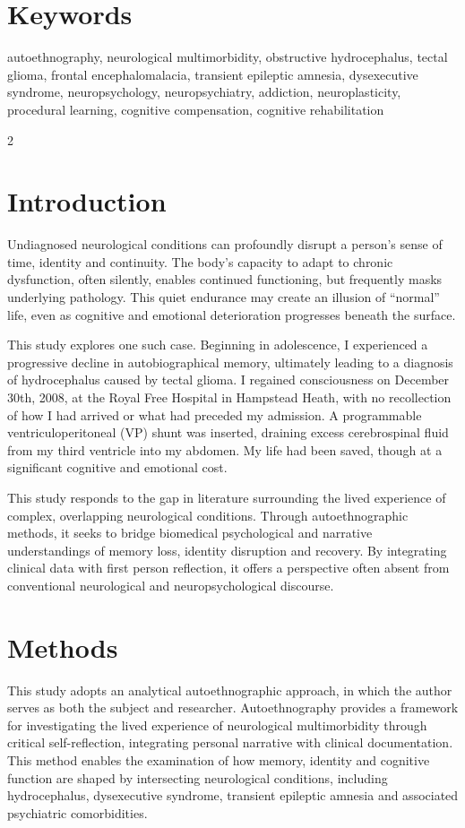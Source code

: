 \documentclass{article}
\begin{document}
\section*{Keywords}
autoethnography, neurological multimorbidity, obstructive hydrocephalus, tectal glioma, frontal encephalomalacia, transient epileptic amnesia, dysexecutive syndrome, neuropsychology, neuropsychiatry, addiction, neuroplasticity, procedural learning, cognitive compensation, cognitive rehabilitation
\begin{multicols}{2}
\section*{Introduction}
Undiagnosed neurological conditions can profoundly disrupt a person’s sense of time, identity and continuity. The body’s capacity to adapt to chronic dysfunction, often silently, enables continued functioning, but frequently masks underlying pathology. This quiet endurance may create an illusion of “normal” life, even as cognitive and emotional deterioration progresses beneath the surface.

This study explores one such case. Beginning in adolescence, I experienced a progressive decline in autobiographical memory, ultimately leading to a diagnosis of hydrocephalus caused by tectal glioma. I regained consciousness on December 30th, 2008, at the Royal Free Hospital in Hampstead Heath, with no recollection of how I had arrived or what had preceded my admission. A programmable ventriculoperitoneal (VP) shunt was inserted, draining excess cerebrospinal fluid from my third ventricle into my abdomen. My life had been saved, though at a significant cognitive and emotional cost.

This study responds to the gap in literature surrounding the lived experience of complex, overlapping neurological conditions. Through autoethnographic methods, it seeks to bridge biomedical psychological and narrative understandings of memory loss, identity disruption and recovery. By integrating clinical data with first person reflection, it offers a perspective often absent from conventional neurological and neuropsychological discourse.

\section*{Methods}
This study adopts an analytical autoethnographic approach, in which the author serves as both the subject and researcher. Autoethnography provides a framework for investigating the lived experience of neurological multimorbidity through critical self-reflection, integrating personal narrative with clinical documentation. This method enables the examination of how memory, identity and cognitive function are shaped by intersecting
neurological conditions, including hydrocephalus, dysexecutive syndrome, transient epileptic amnesia and associated psychiatric comorbidities.


\end{multicols}
\end{document}
